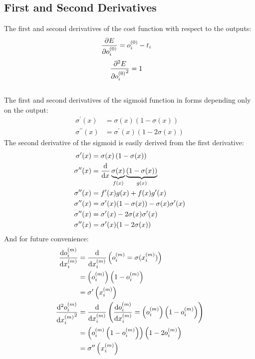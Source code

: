 \subsection{First and Second Derivatives} 
The first and second derivatives of the cost function with respect to the outputs:
\begin{align}
\pdv{E}{o_{i}^{(0)}} &= o_{i}^{(0)} - t_{i} \label{cost_func_derivative}
\end{align}
\begin{align}
\pdv[2]{E}{{o_{i}^{(0)}}} &= 1\label{cost_func_2nd_derivative}
\end{align}
\\[5pt]
The first and second derivatives of the sigmoid function in forms depending only on the output:
\begin{align}
\sigma^{\prime}(x) &= \sigma(x)\left(1 - \sigma(x)\right)\label{sigmoid_derivative} 
\\
\sigma^{\prime\prime}(x) &= \sigma^{\prime}(x)\left(1 - 2\sigma(x)\right) \label{sigmoid_2nd_derivative}
\end{align}
The second derivative of the sigmoid is easily derived from the first derivative:
\begin{align}
\sigma^{\prime}(x) &= \sigma(x)\left(1 - \sigma(x)\right)
\\
\sigma^{\prime\prime}(x) &= \dv{}{x}
\underbrace{\sigma(x)}_{f(x)}
\underbrace{\left(1 - \sigma(x)\right)}_{g(x)}
\\
\sigma^{\prime\prime}(x) &= f^{\prime}(x)g(x) + f(x)g^{\prime}(x)
\\
\sigma^{\prime\prime}(x) &= \sigma^{\prime}(x)(1-\sigma(x)) - \sigma(x)\sigma^{\prime}(x)
\\
\sigma^{\prime\prime}(x) &= \sigma^{\prime}(x) - 2\sigma(x)\sigma^{\prime}(x)
\\
\sigma^{\prime\prime}(x) &= \sigma^{\prime}(x)(1 - 2\sigma(x))
\end{align}
And for future convenience: 
\begin{align}
\dv{o_{i}^{(m)}}{x_{i}^{(m)}} &= 
\dv{}{x_{i}^{(m)}}\left({o_{i}^{(m)}} = \sigma(x_{i}^{(m)})\right) 
\\
&= \left(o_{i}^{(m)}\right)\left(1 - o_{i}^{(m)}\right)
\\
&= \sigma^{\prime}\left(x_{i}^{(m)}\right)
\\
\dv[2]{{o_{i}^{(m)}}}{{x_{i}^{(m)}}} &=
\dv{}{{x_{i}^{(m)}}}\left(\dv{o_{i}^{(m)}}{x_{i}^{(m)}} = \left(o_{i}^{(m)}\right)\left(1 - o_{i}^{(m)}\right)\right)
\\
&= \left(o_{i}^{(m)}\left(1 - o_{i}^{(m)}\right)\right)\left(1 - 2o_{i}^{(m)}\right)
\\
&= \sigma^{\prime\prime}\left(x_{i}^{(m)}\right)
\end{align}
